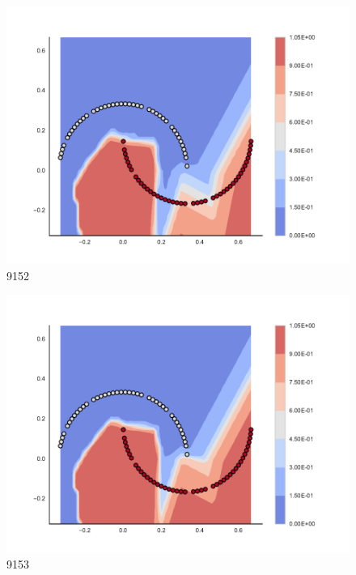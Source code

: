 \begin{subfigure}[b]{0.09\textwidth}
    \includegraphics[clip, trim=2.35cm 1.75cm 4.5cm 0cm,width=\textwidth]{img/convergence/9152.pdf}
    \caption{9152}
    \label{fig:convergence_9152}
\end{subfigure}
%
\begin{subfigure}[b]{0.09\textwidth}
    \includegraphics[clip, trim=2.35cm 1.75cm 4.5cm 0cm,width=\textwidth]{img/convergence/9153.pdf}
    \caption{9153}
    \label{fig:convergence_9153}
\end{subfigure}
%

